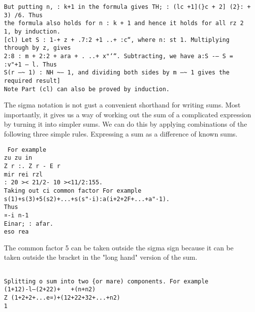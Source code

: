 \documentclass[]{article}
\begin{document}
\begin{verbatim}
But putting n, : k+1 in the formula gives TH; : (lc +1](}c + 2] (2}: + 3) /6. Thus
the formula also holds for n : k + 1 and hence it holds for all rz 2 1, by induction.
[cl) Let S : 1-+ z + .7:2 +1 ..+ :c“, where n: st 1. Multiplying through by z, gives
2:8 : m + 2:2 + ara + . ..+ x"‘“. Subtracting, we have a:S -— S = :v"+1 — l. Thus
S(r —~ 1) : NH ~— 1, and dividing both sides by m —~ 1 gives the required result]
Note Part (cl) can also be proved by induction.

\end{verbatim}
The sigma notation is not gust a convenient shorthand for writing sums. Most
importantly, it gives us a way of working out the sum of a complicated expression
by turning it into simpler sums. We can do this by applying combinations of the
following three simple rules.
Expressing a sum as a difference of known sums.
\begin{verbatim}
 For example
zu zu in
Z r :. Z r - E r
mir rei rzl
: 20 >< 21/2- 10 ><11/2:155.
Taking out ci common factor For example
s(1)+s(3)+5(s2)+...+s(s"·i):a(i+2+2F+...+a"·1).
Thus
¤-i n-1
Einar; : afar.
eso rea
\end{verbatim}
The common factor 5 can be taken outside the sigma sign because it can be taken
outside the bracket in the "long hand" version of the sum.
\begin{verbatim}

Splitting o sum into two {or mare) components. For example
(1+12)-l—(2+22)+   +(n+n2)
Z (1+2+2+...e¤)+(12+22+32+...+n2)
1

\end{verbatim}
\end{document}
